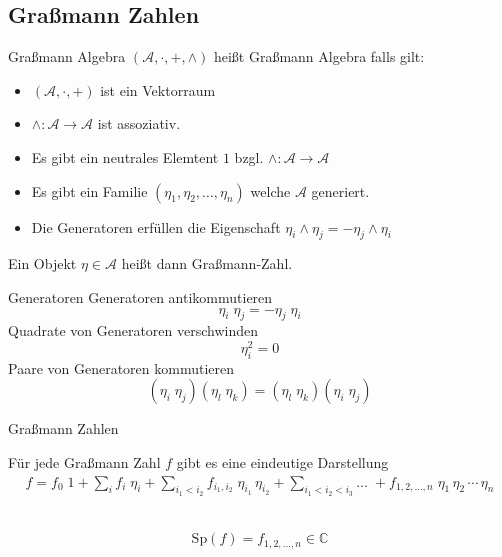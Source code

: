 \documentclass[11pt]{beamer}
\newcommand{\Sp}[1]{\mathrm{Sp}\left( #1 \right)}
\begin{document}
\subsection{Graßmann Zahlen}
    
    \begin{frame}{Graßmann Algebra}
     $(\mathcal A, \cdot, +, \wedge)$ heißt Graßmann Algebra falls gilt: 
     \vspace{0.5cm}
    \begin{itemize}
    \item $(\mathcal A, \cdot, +)$ ist ein Vektorraum
    \item $\wedge: \mathcal A \rightarrow \mathcal A$ ist assoziativ.
    \item Es gibt ein neutrales Elemtent $1$ bzgl. $\wedge: \mathcal A \rightarrow \mathcal A$ 
    \item Es gibt ein Familie $(\eta_1, \eta_2, \dots, \eta_n)$ welche $\mathcal A$ generiert.
    \item Die Generatoren erfüllen die Eigenschaft $\eta_i \wedge \eta_j = - \eta_j \wedge \eta_i$
    \end{itemize}
    \vspace{0.5cm}
    Ein Objekt $\eta \in\mathcal{A}$ heißt dann Graßmann-Zahl.
    \end{frame}
    
    \begin{frame}{Generatoren}
    Generatoren antikommutieren
    \begin{equation} \nonumber
    \eta_i \; \eta_j = - \eta_j \;\eta_i
    \end{equation}
    \pause
    Quadrate von Generatoren verschwinden
    \begin{equation} \nonumber
    \eta_i^2 = 0
    \end{equation}
    \pause
    Paare von Generatoren kommutieren
    \begin{equation} \nonumber
    (\eta_i\; \eta_j) (\eta_l \;\eta_k) = (\eta_l\; \eta_k) (\eta_i\; \eta_j)
    \end{equation}

    \end{frame}
    
    \begin{frame}{Graßmann Zahlen}
    
     Für jede Graßmann Zahl $f$ gibt es eine eindeutige Darstellung\\
     \begin{align} \nonumber 
     f = f_0\;1 + \sum_{i} f_i \;\eta_i + \sum_{i_1<i_2} f_{i_1,i_2} \;\eta_{i_1} \,\eta_{i_2} + \sum_{i_1<i_2<i_3} \dots \;+ f_{1,2,\dots,n} \; \eta_{1}\,\eta_{2}\,\cdots\,\eta_{n}
     \end{align}\\
     \vspace{0.5cm}
     \pause
     \begin{grayframe}[frametitle = {Spur einer Graßmann Zahl}]
     \begin{equation}\nonumber
     \Sp{f} = f_{1,2,\dots,n} \in \mathbb{C}
     \end{equation}
     \end{grayframe}
     \end{frame}
    
\end{document}

